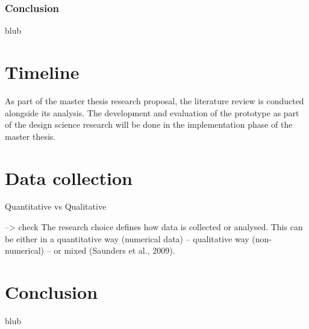
\subsubsection{Conclusion}

blub



\section{Timeline}

As part of the master thesis research proposal, the literature review is conducted alongside its analysis. The development and evaluation of the prototype as part of the design science research will be done in the implementation phase of the master thesis.



\section{Data collection}

Quantitative vs Qualitative

--> check The research choice defines how data is collected or analysed. This can be either in a quantitative way (numerical data) – qualitative way (non-numerical) – or mixed (Saunders et al., 2009).





\section{Conclusion}

blub

